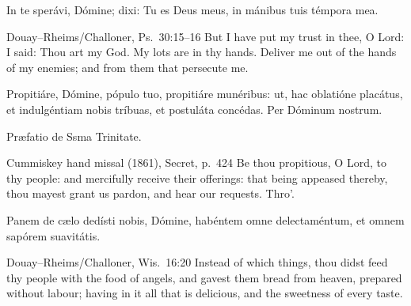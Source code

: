 In te sperávi, Dómine; dixi: Tu es Deus meus, in mánibus tuis témpora mea.
\finishfulltextelement
\begin{fulltextenglish}{Douay--Rheims/Challoner, Ps.~30:15--16}
But I have put my trust in thee, O Lord: I said: Thou art my God. My lots are
in thy hands. Deliver me out of the hands of my enemies; and from them that
persecute me.
\end{fulltextenglish}

Propitiáre, Dómine, pópulo tuo, propitiáre munéribus: ut, hac oblatióne
placátus, et indulgéntiam nobis tríbuas, et postuláta concédas. Per Dóminum
nostrum.

Præfatio de Ssma Trinitate.
\finishfulltextelement
\begin{fulltextenglish}{Cummiskey hand missal (1861), Secret, p.~424}
Be thou propitious, O Lord, to thy people: and mercifully receive their
offerings: that being appeased thereby, thou mayest grant us pardon, and hear
our requests. Thro'.
\end{fulltextenglish}

Panem de cælo dedísti nobis, Dómine, habéntem omne delectaméntum, et omnem
sapórem suavitátis.
\finishfulltextelement
\begin{fulltextenglish}{Douay--Rheims/Challoner, Wis.~16:20}
Instead of which things, thou didst feed thy people with the food of angels,
and gavest them bread from heaven, prepared without labour; having in it all
that is delicious, and the sweetness of every taste.
\end{fulltextenglish}

